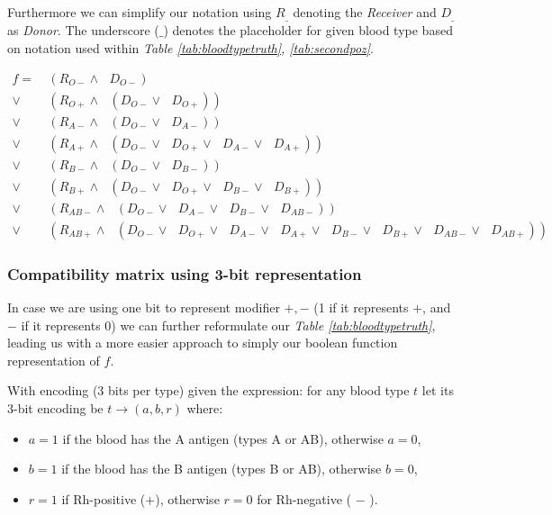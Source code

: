 \documentclass{article}
\begin{document}
Furthermore we can simplify our notation using $R_{\_}$ denoting the \textit{Receiver} and $D_{\_}$ as \textit{Donor}. The underscore ($\_$) denotes the placeholder for given blood type based on notation used within \textit{Table \ref{tab:bloodtypetruth}, \ref{tab:secondpoz}}.


\[
\begin{aligned}
f =\ & (R_{O-} \land~~\ D_{O-}) \\
\lor~~\ & (R_{O+} \land~~\ (D_{O-} \lor~~\ D_{O+})) \\
\lor~~\ & (R_{A-} \land~~\ (D_{O-} \lor~~\ D_{A-})) \\
\lor~~\ & (R_{A+} \land~~\ (D_{O-} \lor~~\ D_{O+} \lor~~\ D_{A-} \lor~~\ D_{A+})) \\
\lor~~\ & (R_{B-} \land~~\ (D_{O-} \lor~~\ D_{B-})) \\
\lor~~\ & (R_{B+} \land~~\ (D_{O-} \lor~~\ D_{O+} \lor~~\ D_{B-} \lor~~\ D_{B+})) \\
\lor~~\ & (R_{AB-} \land~~\ (D_{O-} \lor~~\ D_{A-} \lor~~\ D_{B-} \lor~~\ D_{AB-})) \\
\lor~~\ & (R_{AB+} \land~~\ (D_{O-} \lor~~\ D_{O+} \lor~~\ D_{A-} \lor~~\ D_{A+} \lor~~\ D_{B-} \lor~~\ D_{B+} \lor~~\ D_{AB-} \lor~~\ D_{AB+}))
\end{aligned}
\]

\subsubsection*{ Compatibility matrix using 3-bit representation }

In case we are using one bit to represent modifier $+,-$ (1 if it represents $+$, and $-$ if it represents $0$)  we can further reformulate our \textit{Table \ref{tab:bloodtypetruth}}, leading us with a more easier approach to simply our boolean function representation of $f$. 

With encoding (3 bits per type) given the expression:  for any blood type $t$ let its 3-bit encoding be $t \rightarrow{ (a,b,r)}$ where: 
\begin{itemize}
    \item  $a = 1$ if the blood has the A antigen\cite{au.mpc.a1.bloodtype.theory} (types A or AB), otherwise $a = 0$,
    \item $b = 1$ if the blood has the B antigen\cite{au.mpc.a1.bloodtype.theory} (types B or AB), otherwise $b = 0$,
    \item $r = 1$ if Rh-positive ($+$), otherwise $r = 0$ for Rh-negative ( $-$ ).
\end{itemize}
\end{document}
